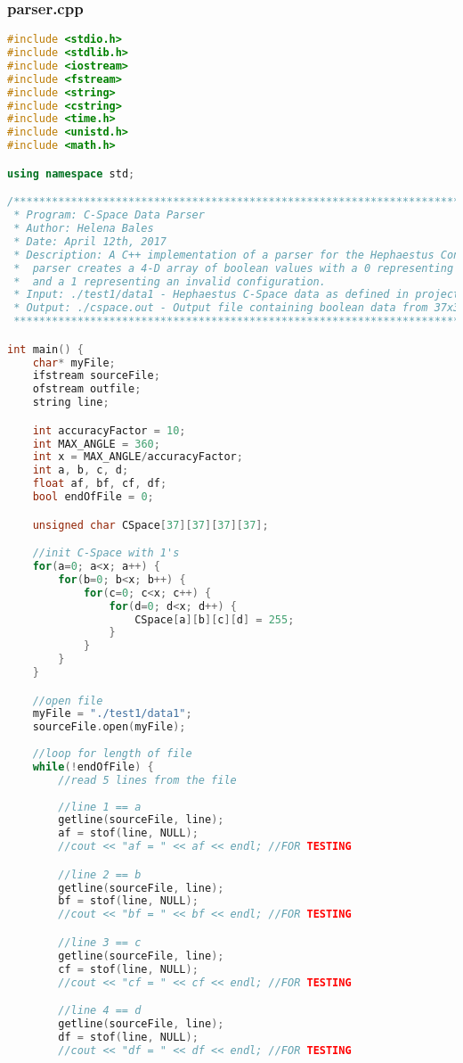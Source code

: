 \subsubsection{parser.cpp}
\begin{lstlisting}[language=C++]
#include <stdio.h>
#include <stdlib.h>
#include <iostream>
#include <fstream>
#include <string>
#include <cstring>
#include <time.h>
#include <unistd.h>
#include <math.h>

using namespace std;

/************************************************************************************************
 * Program: C-Space Data Parser
 * Author: Helena Bales
 * Date: April 12th, 2017
 * Description: A C++ implementation of a parser for the Hephaestus Configuration Space data. The 
 * 	parser creates a 4-D array of boolean values with a 0 representing a valid configuration 
 * 	and a 1 representing an invalid configuration.
 * Input: ./test1/data1 - Hephaestus C-Space data as defined in project docs
 * Output: ./cspace.out - Output file containing boolean data from 37x37x37x37 array
 ***********************************************************************************************/

int main() {
	char* myFile;
	ifstream sourceFile;
	ofstream outfile;
	string line;

	int accuracyFactor = 10;
	int MAX_ANGLE = 360;
	int x = MAX_ANGLE/accuracyFactor;
	int a, b, c, d;
	float af, bf, cf, df;
	bool endOfFile = 0;

	unsigned char CSpace[37][37][37][37];

	//init C-Space with 1's
	for(a=0; a<x; a++) {
		for(b=0; b<x; b++) {
			for(c=0; c<x; c++) {
				for(d=0; d<x; d++) {
					CSpace[a][b][c][d] = 255;
				}
			}
		}
	}

	//open file
	myFile = "./test1/data1";
	sourceFile.open(myFile);
	
	//loop for length of file
	while(!endOfFile) {
		//read 5 lines from the file
		
		//line 1 == a
		getline(sourceFile, line);
		af = stof(line, NULL);
		//cout << "af = " << af << endl; //FOR TESTING

		//line 2 == b
		getline(sourceFile, line);
		bf = stof(line, NULL);
		//cout << "bf = " << bf << endl; //FOR TESTING

		//line 3 == c
		getline(sourceFile, line);
		cf = stof(line, NULL);
		//cout << "cf = " << cf << endl; //FOR TESTING

		//line 4 == d
		getline(sourceFile, line);
		df = stof(line, NULL);
		//cout << "df = " << df << endl; //FOR TESTING


\end{lstlisting}
